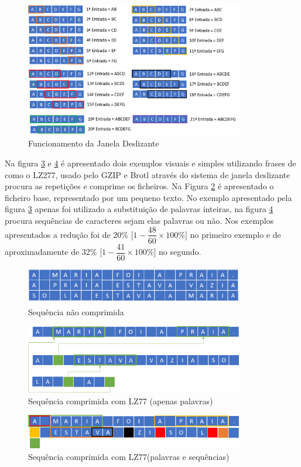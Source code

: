 \begin{figure}[htb]
\centering
\includegraphics[width=0.85\textwidth]{images/janeladeslizantedicionario.png}
\caption{Funcionamento da Janela Deslizante}\label{janela}
\end{figure}


\par Na figura \ref{gzip} e \ref{gzip2} é apresentado dois exemplos visuais e simples utilizando frases de como o LZ277, usado pelo GZIP e Brotl através do sistema de janela deslizante procura as repetições e comprime os ficheiros. Na Figura \ref{unzip} é apresentado o ficheiro base, representado por um pequeno texto. No exemplo apresentado pela figura \ref{gzip} apenas foi utilizado a substituição de palavras inteiras, na figura \ref{gzip2} procura sequências de caracteres sejam elas palavras ou não. Nos exemplos apresentados a redução foi de 20\% [$1-\dfrac{48}{60}\times100\%$] no primeiro exemplo e de aproximadamente de 32\% [$1-\dfrac{41}{60}\times100\%$] no segundo.
\begin{figure}[htb]
\centering
\includegraphics[width=0.85\textwidth]{images/FILE.png}
\caption{Sequência não comprimida}\label{unzip}
\end{figure}

\begin{figure}[htb]
\centering
\includegraphics[width=0.85\textwidth]{images/gzip.png}
\caption{Sequência comprimida com LZ77 (apenas palavras)}\label{gzip}
\end{figure}
\begin{figure}[htb]
\centering
\includegraphics[width=0.85\textwidth]{images/gzip2.png}
\caption{Sequência comprimida com LZ77(palavras e sequências)}\label{gzip2}
\end{figure}


